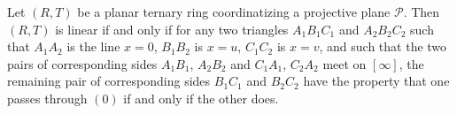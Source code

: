 \begin{theorem}
\label{thm:ptr-linearity-condition}
Let $(R,T)$ be a planar ternary ring coordinatizing a projective plane $\mathcal{P}$.
Then $(R,T)$ is linear if and only if for any two triangles
$A_1B_1C_1$ and $A_2B_2C_2$ such that $A_1A_2$ is the line $x=0$, $B_1B_2$ is $x=u$,
$C_1C_2$ is $x=v$, and such that the two pairs of corresponding sides
$A_1B_1$, $A_2B_2$ and $C_1A_1$, $C_2A_2$ meet on $[\infty]$, the remaining pair
of corresponding sides $B_1C_1$ and $B_2C_2$ have the property that one passes
through $(0)$ if and only if the other does.
\end{theorem}
